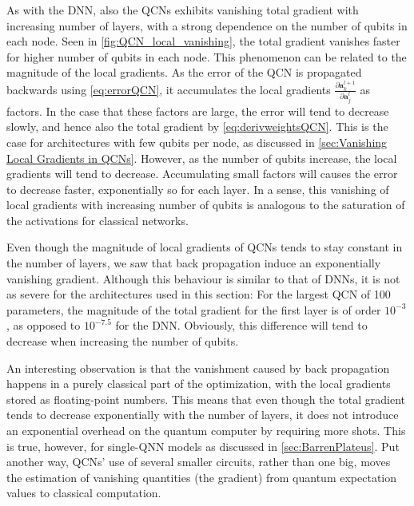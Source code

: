 As with the DNN, also the QCNs exhibits vanishing total gradient with increasing number of layers, with a strong dependence on the number of qubits in each node. Seen in \autoref{fig:QCN_local_vanishing}, the total gradient vanishes faster for higher number of qubits in each node. This phenomenon can be related to the magnitude of the local gradients. As the error of the QCN is propagated backwards using \autoref{eq:errorQCN}, it accumulates the local gradients $\frac{\partial \boldsymbol{a}^{l+1}_k}{\partial \boldsymbol{a}^{l}_j}$ as factors. In the case that these factors are large, the error will tend to decrease slowly, and hence also the total gradient by \autoref{eq:derivweightsQCN}. This is the case for architectures with few qubits per node, as discussed in \autoref{sec:Vanishing Local Gradients in QCNs}. However, as the number of qubits increase, the local gradients will tend to decrease. Accumulating small factors will causes the error to decrease faster, exponentially so for each layer. In a sense, this vanishing of local gradients with increasing number of qubits is analogous to the saturation of the activations for classical networks.

Even though the magnitude of local gradients of QCNs tends to stay constant in the number of layers, we saw that back propagation induce an exponentially vanishing gradient. Although this behaviour is similar to that of DNNs, it is not as severe for the architectures used in this section: For the largest QCN of 100 parameters, the magnitude of the total gradient for the first layer is of order $10^{-3}$, as opposed to $10^{-7.5}$ for the DNN. Obviously, this difference will tend to decrease when increasing the number of qubits. 

An interesting observation is that the vanishment caused by back propagation happens in a purely classical part of the optimization, with the local gradients stored as floating-point numbers. This means that even though the total gradient tends to decrease exponentially with the number of layers, it does not introduce an exponential overhead on the quantum computer by requiring more shots. This is true, however, for single-QNN models as discussed in \autoref{sec:BarrenPlateus}. Put another way, QCNs' use of several smaller circuits, rather than one big, moves the estimation of vanishing quantities (the gradient) from quantum expectation values to classical computation.       

